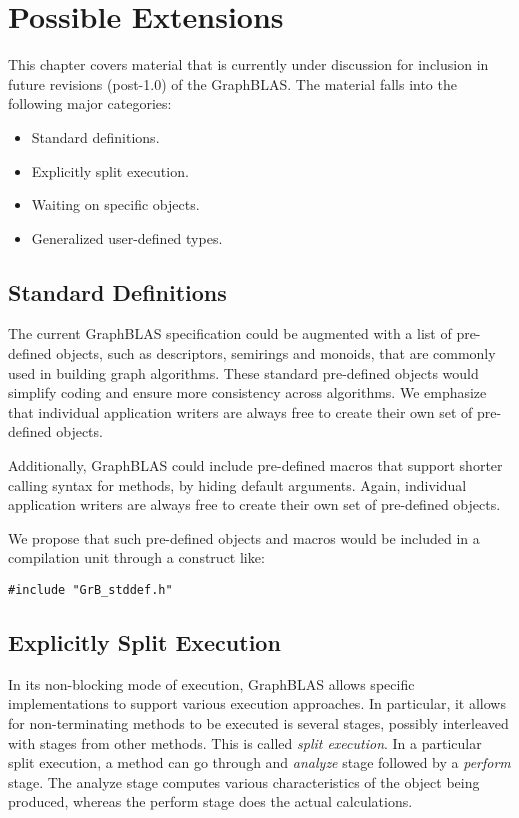 \chapter{Possible Extensions}
\label{Chp:Extensions}

This chapter covers material that is currently under discussion for inclusion in 
future revisions (post-1.0) of the GraphBLAS. The material falls into the
following major categories:

\begin{itemize}
\item Standard definitions.
\item Explicitly split execution.
\item Waiting on specific objects.
\item Generalized user-defined types.
\end{itemize}

\section{Standard Definitions}

The current GraphBLAS specification could be augmented with a list of 
pre-defined objects, such as descriptors, semirings and monoids, that are commonly used
in building graph algorithms. These standard pre-defined objects would
simplify coding and ensure more consistency across algorithms. 
We emphasize
that individual application writers are always free to create their own set of
pre-defined objects.

Additionally, GraphBLAS could include pre-defined macros that support
shorter calling syntax for methods, by hiding default arguments. 
Again, individual application writers are always free to create their
own set of pre-defined objects.

We propose that such pre-defined objects and macros would
be included in a compilation unit through a construct like:

\begin{verbatim}
#include "GrB_stddef.h"
\end{verbatim}

\section{Explicitly Split Execution}

In its non-blocking mode of execution, GraphBLAS allows specific implementations to support
various execution approaches. In particular, it allows for non-terminating methods to be 
executed is several stages, possibly interleaved with stages from other methods. This is called \emph{split execution}. In a particular split execution,
a method can go through and \emph{analyze} stage followed by a \emph{perform} stage.
The analyze stage computes various characteristics of the object being produced, whereas the
perform stage does the actual calculations.

